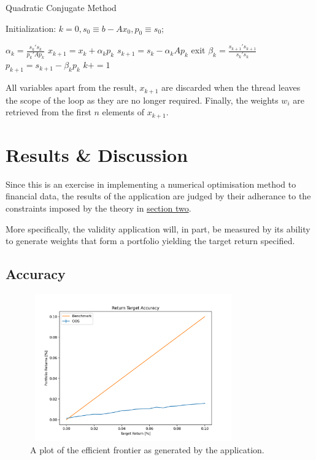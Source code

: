 \documentclass{article}
\begin{document}
\newpage 


\begin{algorithm}
	\caption{Quadratic Conjugate Method} 
	
	Initialization: $k=0, s_0 \equiv b - Ax_0, p_0 \equiv s_0$;
	
	\begin{algorithmic}[1]
		\State $\alpha_k = \frac{s_{k}'s_{k}}{p_{k}'Ap_{k}}$
		\State $x_{k+1} = x_{k} + 	\alpha_kp_{k}$
		\State $s_{k+1} = s_{k} - 	\alpha_kAp_{k}$
		\State exit
		\EndIf
		\State $\beta_k = \frac{s_{k+1}'s_{k+1}}{s_{k}'s_{k}}$
		\State $p_{k+1} = s_{k+1} - 	\beta_kp_{k}$
		\State $k+=1$
		\EndWhile
	\end{algorithmic} 
\end{algorithm}


All variables apart from the result, $x_{k+1}$ are discarded when the thread leaves the scope of the loop as they are no longer required. Finally, the weights $w_{i}$ are retrieved from the first $n$ elements of $x_{k+1}$. 













\section{Results \& Discussion}
\label{sec:results}

Since this is an exercise in implementing a numerical optimisation method to financial data, the results of the application are judged by their adherance to the constraints imposed by the theory in \hyperref[theory]{section two}.

More specifically, the validity application will, in part, be measured by its ability to generate weights that form a portfolio yielding the target return specified.



\subsection{Accuracy}


\begin{figure}[H]
	\centerline{\includegraphics[width=3.5in,height=2.5in]{figures/oos_accuracy.png}}
	\label{oos_accuracy}
	\caption{A plot of the efficient frontier as generated by the application.}
\end{figure}
\end{document}
